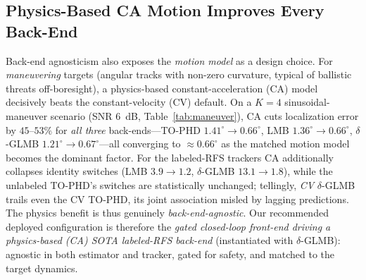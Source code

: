 \documentclass[journal]{IEEEtran}
\begin{document}
\subsection{Physics-Based CA Motion Improves Every Back-End}
\label{sec:exp_ca}
Back-end agnosticism also exposes the \emph{motion model} as a design choice. For
\emph{maneuvering} targets (angular tracks with non-zero curvature, typical of
ballistic threats off-boresight), a physics-based constant-acceleration (CA) model
decisively beats the constant-velocity (CV) default. On a $K=4$ sinusoidal-maneuver
scenario (SNR $6$~dB, Table~\ref{tab:maneuver}), CA cuts localization error by
$45$--$53\%$ for \emph{all three} back-ends---TO-PHD $1.41^\circ\!\to\!0.66^\circ$,
LMB $1.36^\circ\!\to\!0.66^\circ$, $\delta$-GLMB $1.21^\circ\!\to\!0.67^\circ$---all
converging to ${\approx}0.66^\circ$ as the matched motion model becomes the dominant
factor. For the labeled-RFS trackers CA additionally collapses identity switches
(LMB $3.9\!\to\!1.2$, $\delta$-GLMB $13.1\!\to\!1.8$), while the unlabeled TO-PHD's
switches are statistically unchanged; tellingly, \emph{CV} $\delta$-GLMB trails even
the CV TO-PHD, its joint association misled by lagging predictions. The physics
benefit is thus genuinely \emph{back-end-agnostic}. Our recommended deployed
configuration is therefore the \emph{gated closed-loop front-end driving a
physics-based (CA) SOTA labeled-RFS back-end} (instantiated with $\delta$-GLMB):
agnostic in both estimator and tracker, gated for safety, and matched to the
target dynamics.

\begin{table}[t]
\centering
\caption{Physics-based CA motion for \emph{maneuvering} targets ($K=4$ sinusoidal maneuver, SNR $6$~dB, $30$ trials, $95\%$ CIs). CA halves localization error for \emph{every} back-end (all $\to\!\approx\!0.66^\circ$); the labeled-RFS trackers (LMB, $\delta$-GLMB) additionally cut identity switches, while the unlabeled TO-PHD's switches are statistically unchanged.}
\label{tab:maneuver}
\small
{}
\end{table}
\end{document}
